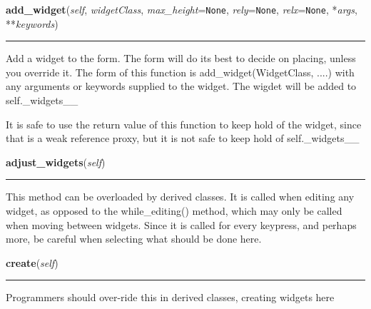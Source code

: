     \begin{boxedminipage}{\textwidth}

    \raggedright \textbf{add\_widget}(\textit{self}, \textit{widgetClass}, \textit{max\_height}=\texttt{None}, \textit{rely}=\texttt{None}, \textit{relx}=\texttt{None}, *\textit{args}, **\textit{keywords})

    \vspace{-1.5ex}

    \rule{\textwidth}{0.5\fboxrule}
    Add a widget to the form.  The form will do its best to decide on 
    placing, unless you override it. The form of this function is 
    add\_widget(WidgetClass, ....) with any arguments or keywords supplied 
    to the widget. The wigdet will be added to self.\_widgets\_\_

    It is safe to use the return value of this function to keep hold of the
    widget, since that is a weak reference proxy, but it is not safe to 
    keep hold of self.\_widgets\_\_

    \vspace{1ex}

    \end{boxedminipage}

    \label{npyscreen:Form:Form:adjust_widgets}
    
    \vspace{0.5ex}

    \begin{boxedminipage}{\textwidth}

    \raggedright \textbf{adjust\_widgets}(\textit{self})

    \vspace{-1.5ex}

    \rule{\textwidth}{0.5\fboxrule}
    This method can be overloaded by derived classes. It is called when 
    editing any widget, as opposed to the while\_editing() method, which 
    may only be called when moving between widgets.  Since it is called for
    every keypress, and perhaps more, be careful when selecting what should
    be done here.

    \vspace{1ex}

    \end{boxedminipage}

    \label{npyscreen:Form:Form:create}
    
    \vspace{0.5ex}

    \begin{boxedminipage}{\textwidth}

    \raggedright \textbf{create}(\textit{self})

    \vspace{-1.5ex}

    \rule{\textwidth}{0.5\fboxrule}
    Programmers should over-ride this in derived classes, creating widgets 
    here

    \vspace{1ex}

    \end{boxedminipage}

